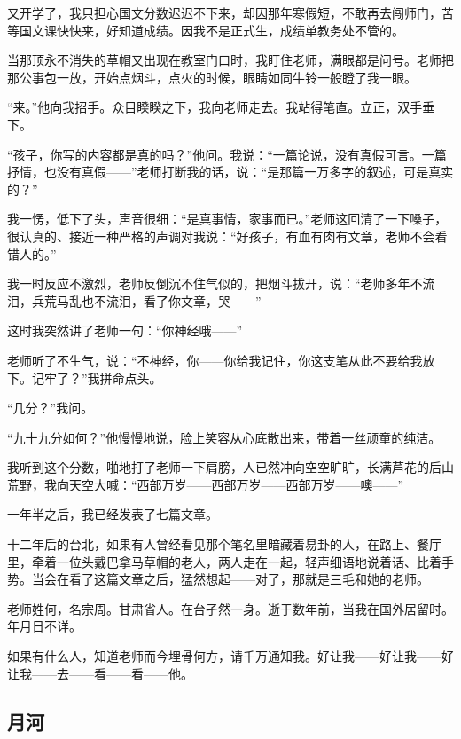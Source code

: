 \par 又开学了，我只担心国文分数迟迟不下来，却因那年寒假短，不敢再去闯师门，苦等国文课快快来，好知道成绩。因我不是正式生，成绩单教务处不管的。
\par 当那顶永不消失的草帽又出现在教室门口时，我盯住老师，满眼都是问号。老师把那公事包一放，开始点烟斗，点火的时候，眼睛如同牛铃一般瞪了我一眼。
\par “来。”他向我招手。众目睽睽之下，我向老师走去。我站得笔直。立正，双手垂下。
\par “孩子，你写的内容都是真的吗？”他问。我说：“一篇论说，没有真假可言。一篇抒情，也没有真假——”老师打断我的话，说：“是那篇一万多字的叙述，可是真实的？”
\par 我一愣，低下了头，声音很细：“是真事情，家事而已。”老师这回清了一下嗓子，很认真的、接近一种严格的声调对我说：“好孩子，有血有肉有文章，老师不会看错人的。”
\par 我一时反应不激烈，老师反倒沉不住气似的，把烟斗拔开，说：“老师多年不流泪，兵荒马乱也不流泪，看了你文章，哭——”
\par 这时我突然讲了老师一句：“你神经哦——”
\par 老师听了不生气，说：“不神经，你——你给我记住，你这支笔从此不要给我放下。记牢了？”我拼命点头。
\par “几分？”我问。
\par “九十九分如何？”他慢慢地说，脸上笑容从心底散出来，带着一丝顽童的纯洁。
\par 我听到这个分数，啪地打了老师一下肩膀，人已然冲向空空旷旷，长满芦花的后山荒野，我向天空大喊：“西部万岁——西部万岁——西部万岁——噢——”
\par 一年半之后，我已经发表了七篇文章。
\par 十二年后的台北，如果有人曾经看见那个笔名里暗藏着易卦的人，在路上、餐厅里，牵着一位头戴巴拿马草帽的老人，两人走在一起，轻声细语地说着话、比着手势。当会在看了这篇文章之后，猛然想起——对了，那就是三毛和她的老师。
\par 老师姓何，名宗周。甘肃省人。在台孑然一身。逝于数年前，当我在国外居留时。年月日不详。
\par 如果有什么人，知道老师而今埋骨何方，请千万通知我。好让我——好让我——好让我——去——看——看——他。




\subsection{月河}


